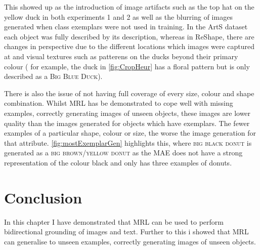This showed up as the introduction of image artifacts such as the top hat on the yellow duck in both experiments 1 and 2 as well as the blurring of images generated when class exemplars were not used in training. In the ArtS dataset each object was fully described by its description, whereas in ReShape, there are changes in perspective due to the different locations which images were captured at and visual textures such as patterens on the ducks beyond their primary colour ( for example, the duck in \autoref{fig:CropHeur} has a floral pattern but is only described as a \textsc{Big Blue Duck}).

There is also the issue of not having full coverage of every size, colour and shape combination. Whilst MRL has be demonstrated to cope well with missing examples, correctly generating images of unseen objects, these images are lower quality than the images generated for objects which have exemplars. The fewer examples of a particular shape, colour or size, the worse the image generation for that attribute. \autoref{fig:mostExemplarGen} highlights this, where \textsc{big black donut} is generated as a \textsc{big brown/yellow donut} as the MAE does not have a strong representation of the colour black and only has three examples of donuts.



\section{Conclusion}
In this chapter I have demonstrated that MRL can be used to perform bidirectional grounding of images and text. Further to this i showed that MRL can generalise to unseen examples, correctly generating images of unseen objects.
\theendnotes